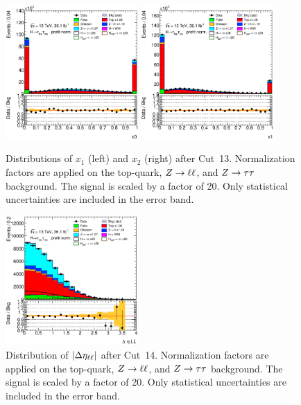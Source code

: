 \begin{figure}[htb]
    \centering
    \includegraphics[width=0.45\textwidth]{./plots/event_selection/ll-CutHPTO-x0-lin.eps}
    \includegraphics[width=0.45\textwidth]{./plots/event_selection/ll-CutHPTO-x1-lin.eps}
    \caption{Distributions of $x_1$ (left) and $x_2$ (right) after Cut~13.
             Normalization factors are applied on the top-quark, $Z \to \ell \ell$, and $Z \to \tau \tau$ background.
             The signal is scaled by a factor of 20.
             Only statistical uncertainties are included in the error band.}\label{fig:event_selection:cutflow:x}
\end{figure}

\begin{figure}[htb]
    \centering
    \includegraphics[width=0.45\textwidth]{./plots/event_selection/ll-CutX-DeltaEtaLL-lin.eps}
    \caption{Distribution of $\left|\Delta \eta_{\ell\ell}\right|$ after Cut~14.
             Normalization factors are applied on the top-quark, $Z \to \ell \ell$, and $Z \to \tau \tau$ background.
             The signal is scaled by a factor of 20.
             Only statistical uncertainties are included in the error band.}\label{fig:event_selection:cutflow:detall}
\end{figure}

